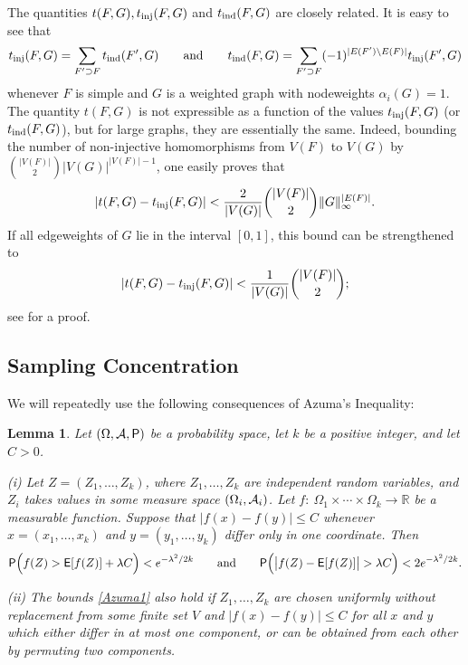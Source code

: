 \documentclass[12pt]{article}
\newtheorem{lemma}[theorem]{Lemma}
\numberwithin{equation}{section}
\def\inj{{\rm inj}}
\def\inj{{\rm inj}}
\def\ind{{\rm ind}}
\def\Prob{{\sf P}}
\def\E{{\sf E}}
\def\R{{\mathbb R}}
\def\AA{{\cal A}}\def\BB{{\cal B}}\def\CC{{\cal C}}
\begin{document}
The quantities $t(F,G),t_\inj(F,G)$ and $t_\ind(F,G)$ are closely
related. It is easy to see  that
\begin{equation}\label{T0T1}
t_\inj(F,G)=\sum_{F'\supset F} t_{\ind}(F',G)
\qquad\text{and}\qquad
t_\ind(F,G)=\sum_{F'\supset F}(-1)^{|E(F')\setminus E(F)|}
t_\inj(F',G)
\end{equation}
whenever $F$ is simple and $G$ is a weighted graph with nodeweights
$\alpha_i(G)=1$. The quantity $t(F,G)$ is not expressible as a
function of the values $t_\inj(F,G)$ (or $t_\ind(F,G)$), but for
large graphs, they are essentially the same.  Indeed, bounding the
number of non-injective homomorphisms from $V(F)$ to $V(G)$ by
$\binom{|V(F)|}{2}|V(G)|^{|V(F)|-1}$, one easily proves that
\begin{equation}\label{TT0}
|t(F,G) -t_\inj(F,G)|
<\frac{2}{|V(G)|}\binom{|V(F)|}{2}\|G\|_\infty^{|E(F)|}.
\end{equation}
If all edgeweights of $G$ lie in the interval $[0,1]$, this bound can
be strengthened to
\begin{equation}\label{TT0-better}
|t(F,G) -t_\inj(F,G)| <\frac{1}{|V(G)|}\binom{|V(F)|}{2};
\end{equation}
see \cite{LSz1} for a proof.

\subsection{Sampling Concentration}

We will repeatedly use the following consequences of Azuma's
Inequality:

\begin{lemma}\label{lem:Azuma}
Let $(\Omega,\AA,\Prob)$ be a probability space, let
$k$ be a positive integer, and let $C>0$.

(i) Let $Z=(Z_1,\dots,Z_k)$, where $Z_1,\dots,Z_k$ are independent
random variables, and $Z_i$ takes values in some measure space
$(\Omega_i,\AA_i)$. Let $f:~\Omega_1\times\cdots\times\Omega_k\to \R$
be a measurable function. Suppose that $|f(x)-f(y)|\le C$ whenever
$x=(x_1,\dots,x_k)$ and $y=(y_1,\dots,y_k)$ differ only in one
coordinate.  Then
\begin{equation}
\Prob\Bigl(f(Z)>\E[f(Z)]+\lambda C\Bigr) <
e^{-\lambda^2/2k} \qquad\text{and}\qquad
\Prob\Bigl(\bigl|f(Z)-\E[f(Z)]\bigr|>\lambda C\Bigr) <
2e^{-\lambda^2/2k}.
\label{Azuma1}
\end{equation}

(ii) The bounds \eqref{Azuma1} also hold if $Z_1,\dots,Z_k$ are
chosen uniformly without replacement from some finite set $V$ and
$|f(x)-f(y)|\leq C$ for all $x$ and $y$ which either differ in at
most one component, or can be obtained from each other by permuting
two components.

\end{lemma}
\end{document}

